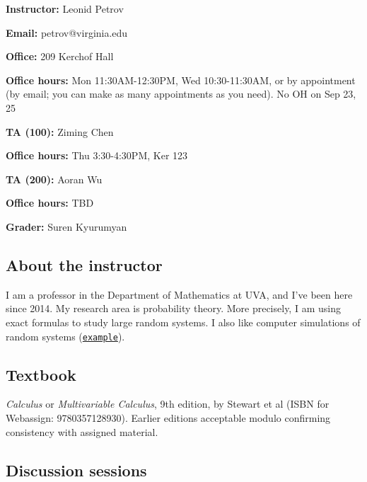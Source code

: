 \documentclass[oneside,11pt]{amsart}
\begin{document}
\parbox{.5\textwidth}{

\textbf{Instructor:} Leonid Petrov

\textbf{Email:} petrov@virginia.edu

\textbf{Office:} 209 Kerchof Hall

\textbf{Office hours:} Mon 11:30AM-12:30PM, Wed 10:30-11:30AM,
or by appointment (by email; you can make as many appointments as you need). No OH on Sep 23, 25}\hspace{30pt}
\parbox{.45\textwidth}{

\textbf{TA (100):} Ziming Chen

\textbf{Office hours:} Thu 3:30-4:30PM, Ker 123

\textbf{TA (200):} Aoran Wu

\textbf{Office hours:} TBD


\vspace{15pt}

\textbf{Grader:} Suren Kyurumyan}

\vspace{5pt}

\subsection{About the instructor}
I am a professor in the Department of Mathematics at UVA, and I've been here since 2014. My research area is probability theory. More precisely, I am using exact formulas to study large random systems. I also like computer simulations of random systems (\href{https://lpetrov.cc/simulations/2019-04-30-qvol/}{\textcolor{green!70!black}{\texttt{example}}}).

\subsection{Textbook}

\emph{Calculus} or \emph{Multivariable Calculus}, 9th edition, by Stewart et al (ISBN for Webassign: 9780357128930). Earlier editions acceptable modulo confirming consistency with assigned material.

\subsection{Discussion sessions} 
\end{document}
